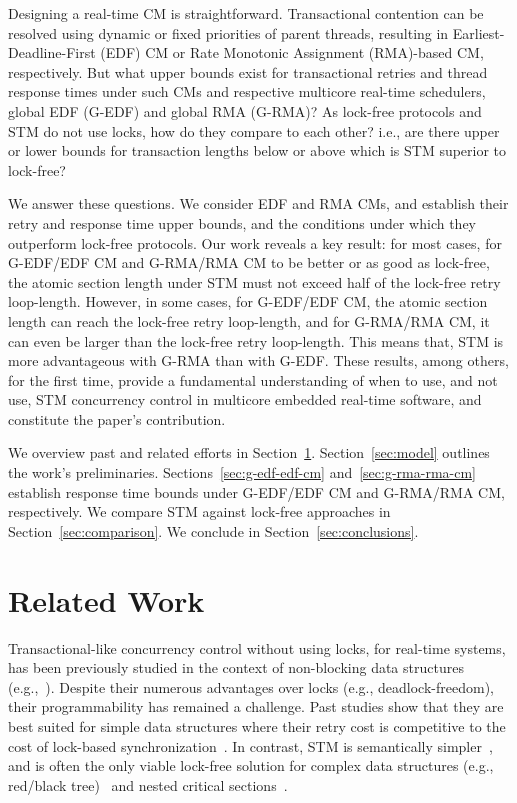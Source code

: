 \documentclass{sig-alternate}
\begin{document}
Designing a real-time CM is straightforward. Transactional contention can be resolved using dynamic or fixed priorities of parent threads, resulting in Earliest-Deadline-First (EDF) CM or Rate Monotonic Assignment (RMA)-based CM, respectively. But what upper bounds exist for transactional retries and thread response times under such CMs and respective multicore real-time schedulers, global EDF (G-EDF) and global RMA (G-RMA)? As lock-free protocols and STM do not use locks, how do they compare to each other? i.e., are there upper or lower bounds for transaction lengths below or above which is STM superior to lock-free?

We answer these questions. We consider EDF and RMA CMs, and establish their retry and response time upper bounds, and the conditions under which they outperform lock-free protocols. Our work reveals a key result: for most cases, for G-EDF/EDF CM and G-RMA/RMA CM to be better or as good as lock-free, the atomic section length under STM must not exceed half of the lock-free retry loop-length. However, in some cases, for G-EDF/EDF CM, the atomic section length can reach the lock-free retry loop-length, and for G-RMA/RMA CM, it can even be larger than the lock-free retry loop-length.  This means that, STM is more advantageous with G-RMA than with G-EDF.
These results, among others, for the first time, provide a
fundamental understanding of when to use, and not use, STM concurrency
control in multicore embedded real-time software, and constitute the
paper's contribution. 

We overview past and related efforts in Section~\ref{sec:past}. Section~\ref{sec:model} outlines the work's preliminaries. Sections~\ref{sec:g-edf-edf-cm} and~\ref{sec:g-rma-rma-cm}
establish response time bounds under G-EDF/EDF CM and G-RMA/RMA CM, 
respectively. We compare STM against lock-free approaches in Section~\ref{sec:comparison}. We conclude in Section~\ref{sec:conclusions}.
\section*{}
\section{Related Work}
\label{sec:past}

Transactional-like concurrency control without using locks, for real-time systems, has been previously studied in the context of non-blocking data structures (e.g.,~\cite{anderson95realtime}). Despite their numerous advantages over locks 
(e.g., deadlock-freedom), 
their programmability has remained a challenge. 
Past studies show that they are best suited for simple data structures where their retry cost is competitive to the cost of lock-based synchronization~\cite{bc+08}.  In contrast, STM is semantically simpler~\cite{Herlihy:2006:AMP:1146381.1146382}, and is often the only viable lock-free solution for complex data structures (e.g., red/black tree)~\cite{key-1} and nested critical sections~\cite{Saha:2006:MHP:1122971.1123001}.
\end{document}

